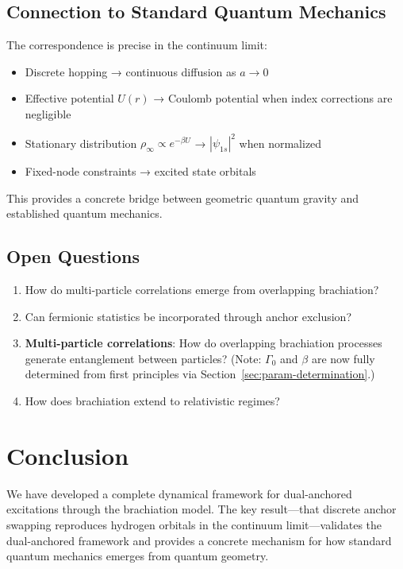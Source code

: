 \documentclass[11pt]{article}
\theoremstyle{plain}
\theoremstyle{definition}
\begin{document}
\subsection{Connection to Standard Quantum Mechanics}

The correspondence is precise in the continuum limit:
\begin{itemize}
  \item Discrete hopping → continuous diffusion as $a \to 0$
  \item Effective potential $U(r)$ → Coulomb potential when index corrections are negligible
  \item Stationary distribution $\rho_\infty \propto e^{-\beta U}$ → $|\psi_{1s}|^2$ when normalized
  \item Fixed-node constraints → excited state orbitals
\end{itemize}

This provides a concrete bridge between geometric quantum gravity and established quantum mechanics.

\subsection{Open Questions}

\begin{enumerate}
  \item How do multi-particle correlations emerge from overlapping brachiation?
  \item Can fermionic statistics be incorporated through anchor exclusion?
  \item \textbf{Multi-particle correlations}: How do overlapping brachiation processes generate entanglement between particles? (Note: $\Gamma_0$ and $\beta$ are now fully determined from first principles via Section~\ref{sec:param-determination}.)
  \item How does brachiation extend to relativistic regimes?
\end{enumerate}
\section{Conclusion}

We have developed a complete dynamical framework for dual-anchored excitations through the brachiation model. The key result—that discrete anchor swapping reproduces hydrogen orbitals in the continuum limit—validates the dual-anchored framework and provides a concrete mechanism for how standard quantum mechanics emerges from quantum geometry.
\end{document}

